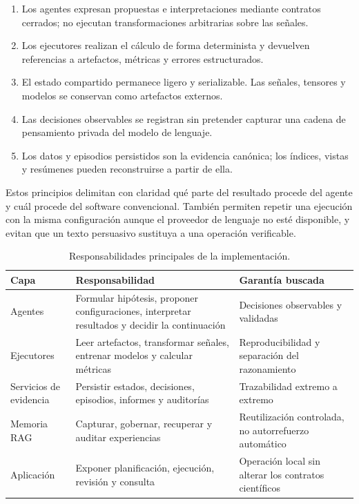 \begin{enumerate}
  \item Los agentes expresan propuestas e interpretaciones mediante contratos
        cerrados; no ejecutan transformaciones arbitrarias sobre las señales.
  \item Los ejecutores realizan el cálculo de forma determinista y devuelven
        referencias a artefactos, métricas y errores estructurados.
  \item El estado compartido permanece ligero y serializable. Las señales,
        tensores y modelos se conservan como artefactos externos.
  \item Las decisiones observables se registran sin pretender capturar una
        cadena de pensamiento privada del modelo de lenguaje.
  \item Los datos y episodios persistidos son la evidencia canónica; los
        índices, vistas y resúmenes pueden reconstruirse a partir de ella.
\end{enumerate}

Estos principios delimitan con claridad qué parte del resultado procede del
agente y cuál procede del software convencional. También permiten repetir una
ejecución con la misma configuración aunque el proveedor de lenguaje no esté
disponible, y evitan que un texto persuasivo sustituya a una operación
verificable.

\begin{table}[htbp]
\centering
\caption{Responsabilidades principales de la implementación.}\label{tab:responsabilidades_implementacion}
\small
\begin{tabularx}{\textwidth}{>{\raggedright\arraybackslash}p{}YY}
\toprule
Capa & Responsabilidad & Garantía buscada \\
\midrule
Agentes & Formular hipótesis, proponer configuraciones, interpretar resultados
y decidir la continuación & Decisiones observables y validadas \\
Ejecutores & Leer artefactos, transformar señales, entrenar modelos y calcular
métricas & Reproducibilidad y separación del razonamiento \\
Servicios de evidencia & Persistir estados, decisiones, episodios, informes y
auditorías & Trazabilidad extremo a extremo \\
Memoria RAG & Capturar, gobernar, recuperar y auditar experiencias & Reutilización
controlada, no autorrefuerzo automático \\
Aplicación & Exponer planificación, ejecución, revisión y consulta & Operación
local sin alterar los contratos científicos \\
\bottomrule
\end{tabularx}
\end{table}

